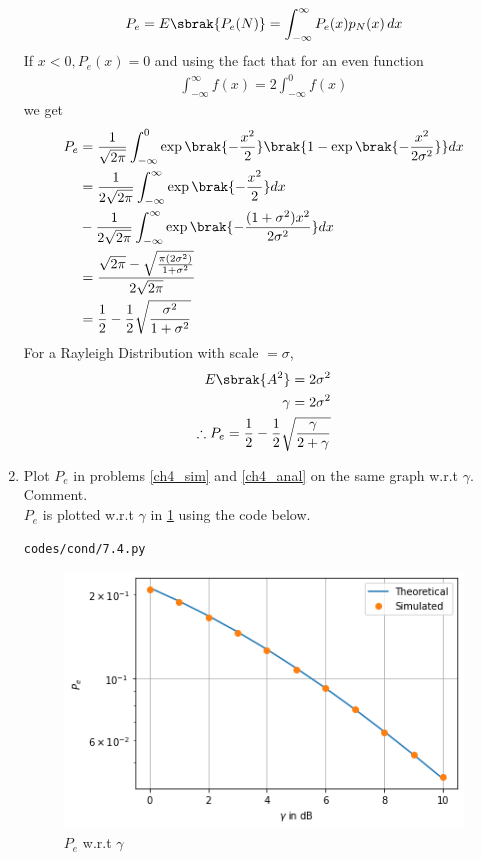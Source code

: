 \begin{enumerate}[label=\thesection.\arabic*.,ref=\thesection.\theenumi]
\begin{align}
 P_e=E\sbrak{P_e(N)} = \int_{-\infty}^{\infty}P_e(x)p_{N}(x)\, dx  
\end{align}
If $x<0, P_e(x)=0$ and using the fact that for an even function
\begin{align}
\int_{-\infty}^{\infty}f(x)=2\int_{-\infty}^{0}f(x)   
\end{align}
we get
\begin{align}
  P_e&= \frac{1}{\sqrt{2\pi}}\int_{-\infty}^{0}\exp \brak{ -\frac{x^2}{2}} \brak{1-\exp \brak{ -\frac{x^2}{2\sigma^2}} } dx\\
&= \frac{1}{2\sqrt{2\pi}} \int_{-\infty}^{\infty} \exp \brak{ -\frac{x^2}{2} }dx \nonumber \\
&- \frac{1}{2\sqrt{2\pi}} \int_{-\infty}^{\infty} \exp \brak{-\frac{(1+ \sigma^2)x^2}{2 \sigma^2}}  dx\\
&= \frac{\sqrt{2\pi} - \sqrt{\frac{\pi(2\sigma^2)}{1+\sigma^2}}}{2\sqrt{2\pi}}\\
&= \frac{1}{2} - \frac{1}{2}\sqrt{\frac{\sigma^2}{1+\sigma^2}}
\end{align}
For a Rayleigh Distribution with scale $= \sigma$,
\begin{align}
E\sbrak{A^2} = 2\sigma^2\\
\gamma = 2\sigma^2\\
\therefore P_e = \frac{1}{2} - \frac{1}{2}\sqrt{\frac{\gamma}{2+\gamma}}
\end{align}
%
%
\item
Plot $P_e$ in problems \ref{ch4_sim} and \ref{ch4_anal} on the same graph w.r.t $\gamma$.  Comment.
\\
\solution $P_e$ is plotted w.r.t $\gamma$ in \ref{fig:probman_p_e_gamma} using the code below.
\begin{lstlisting}
codes/cond/7.4.py
\end{lstlisting}
\begin{figure}[!ht]
\centering
\includegraphics[width=\columnwidth]{figs/cond/7.4.png}
\caption{$P_e$ w.r.t $\gamma$}
\label{fig:probman_p_e_gamma}
\end{figure}
%
\end{enumerate}
